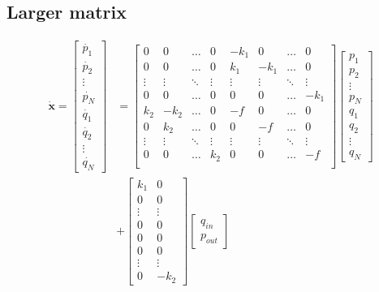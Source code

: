 \subsection{Larger matrix}
\begin{align}\label{AB matrix}
	\dot{\mathbf{x}} = 
	\begin{bmatrix}
	\dot{p_1}\\
	\dot{p_2}\\
	\vdots\\
	\dot{p_N}\\
	\dot{q_1}\\
	\dot{q_2}\\
	\vdots\\
	\dot{q_N}
	\end{bmatrix}
	&=
	\begin{bmatrix}
	0 & 0 & \ldots & 0 & -k_1 & 0 & \ldots & 0\\
	0 & 0 & \ldots & 0 & k_1 & -k_1 & \ldots & 0\\
	\vdots & \vdots &\ddots &\vdots &\vdots & \vdots & \ddots & \vdots \\
	0 & 0 & \ldots & 0 & 0 & 0 & \ldots & -k_1\\
	k_2 & -k_2 & \ldots & 0 & -f & 0 & \ldots & 0\\
	0 & k_2 & \ldots & 0 & 0 & -f & \ldots & 0\\
	\vdots & \vdots & \ddots & \vdots &\vdots &\vdots & \ddots & \vdots \\
	0 & 0 & \ldots & k_2 & 0 & 0 & \ldots & -f \\
	\end{bmatrix}
	\begin{bmatrix}
	p_1\\p_2\\\vdots\\p_N\\q_1\\q_2\\ \vdots\\q_N
	\end{bmatrix}\\
	&+ \begin{bmatrix}
	k_1 & 0\\ 0 & 0\\\vdots & \vdots\\ 0 & 0 \\ 0 & 0 \\ 0 & 0 \\\vdots & \vdots\\ 0 & -k_2
	\end{bmatrix} 
	\begin{bmatrix}
	q_{in} \\ p_{out}
	\end{bmatrix}
\end{align}

